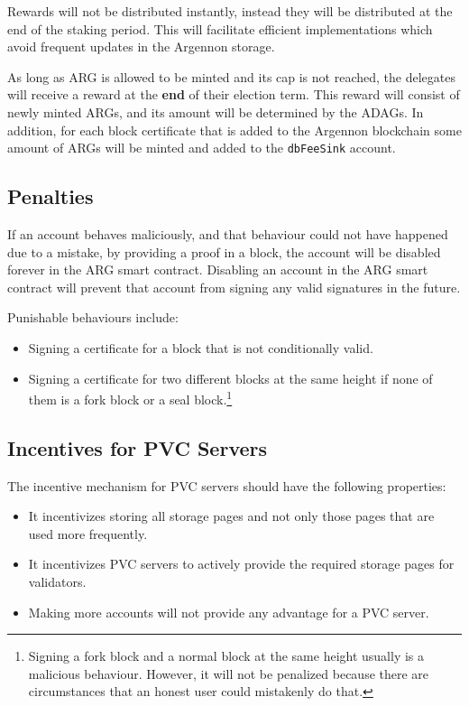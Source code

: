 Rewards will not be distributed instantly, instead they will be distributed at the end of the staking period.
This will facilitate efficient implementations which avoid frequent updates in the Argennon storage.

As long as ARG is allowed to be minted and its cap is not reached, the delegates will receive a reward at the
\textbf{end} of their election term. This reward will consist of newly minted ARGs, and its amount will be
determined by the ADAGs. In addition, for each block certificate that is added to the Argennon blockchain some amount
of ARGs will be minted and added to the \texttt{dbFeeSink} account.

\subsection{Penalties}\label{subsec:penalties}

If an account behaves maliciously, and that behaviour could not have happened due to a mistake, by providing a proof
in a block, the account will be disabled forever in the ARG smart contract. Disabling an account in the
ARG smart contract will prevent that account from signing any valid signatures in the future.

Punishable behaviours include:
\begin{itemize}
    \item Signing a certificate for a block that is not conditionally valid.
    \item Signing a certificate for two different blocks at the same height if none of them
    is a fork block or a seal block.\footnote{Signing
    a fork block and a normal block at the same height usually is a malicious behaviour. However, it will not be
    penalized because there are circumstances that an honest user could mistakenly do that.}
\end{itemize}

\subsection{Incentives for PVC Servers}\label{subsec:PVC-servers}

The incentive mechanism for PVC servers should have the following properties:

\begin{itemize}
    \item It incentivizes storing all storage pages and not only those pages that are used more frequently.
    \item It incentivizes PVC servers to actively provide the required storage pages for validators.
    \item Making more accounts will not provide any advantage for a PVC server.
\end{itemize}

